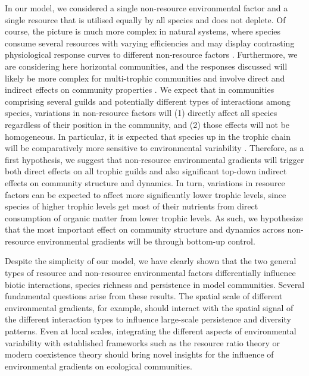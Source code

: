 In our model, we considered a single non-resource environmental factor and a single resource that is utilised equally by all species and does not deplete. Of course, the picture is much more complex in natural systems, where species consume several resources with varying efficiencies \citep{Chapin1987} and may display contrasting physiological response curves to different non-resource factors \citep{Austin1994}. Furthermore, we are considering here horizontal communities, and the responses discussed will likely be more complex for multi-trophic communities and involve direct and indirect effects on community properties \citep{Menge1987,Bruno2003}. We expect that in communities comprising several guilds and potentially different types of interactions among species, variations in non-resource factors will (1) directly affect all species regardless of their position in the community, and (2) those effects will not be homogeneous. In particular, it is expected that species up in the trophic chain will be comparatively more sensitive to environmental variability \citep{Voigt2003}. Therefore, as a first hypothesis, we suggest that non-resource environmental gradients will trigger both direct effects on all trophic guilds and also significant top-down indirect effects on community structure and dynamics. In turn, variations in resource factors can be expected to affect more significantly lower trophic levels, since species of higher trophic levels get most of their nutrients from direct consumption of organic matter from lower trophic levels. As such, we hypothesize that the most important effect on community structure and dynamics across non-resource environmental gradients will be through bottom-up control.

Despite the simplicity of our model, we have clearly shown that the two general types of resource and non-resource environmental factors differentially influence biotic interactions, species richness and persistence in model communities. Several fundamental questions arise from these results. The spatial scale of different environmental gradients, for example, should interact with the spatial signal of the different interaction types \citep{Araujo2014} to influence large-scale persistence and diversity patterns. Even at local scales, integrating the different aspects of environmental variability with established frameworks such as the resource ratio theory or modern coexistence theory should bring novel insights for the influence of environmental gradients on ecological communities.
